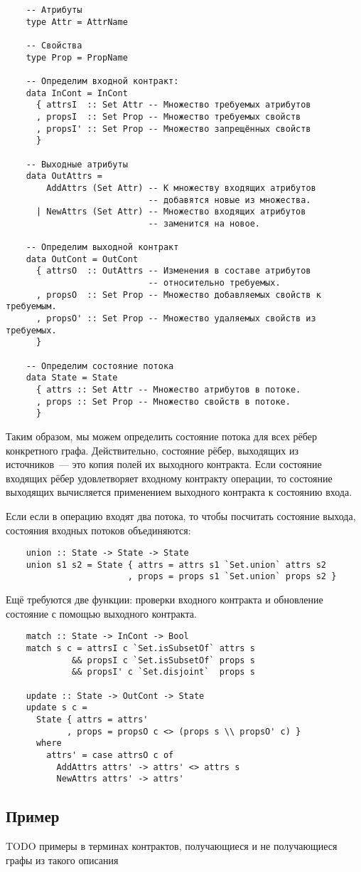 \begin{lstlisting}
    -- Атрибуты
    type Attr = AttrName

    -- Свойства
    type Prop = PropName

    -- Определим входной контракт:
    data InCont = InCont
      { attrsI  :: Set Attr -- Множество требуемых атрибутов
      , propsI  :: Set Prop -- Множество требуемых свойств
      , propsI' :: Set Prop -- Множество запрещённых свойств
      }

    -- Выходные атрибуты
    data OutAttrs =
        AddAttrs (Set Attr) -- К множеству входящих атрибутов
                            -- добавятся новые из множества.
      | NewAttrs (Set Attr) -- Множество входящих атрибутов
                            -- заменится на новое.

    -- Определим выходной контракт
    data OutCont = OutCont
      { attrsO  :: OutAttrs -- Изменения в составе атрибутов
                            -- относительно требуемых.
      , propsO  :: Set Prop -- Множество добавляемых свойств к требуемым.
      , propsO' :: Set Prop -- Множество удаляемых свойств из требуемых.
      }

    -- Определим состояние потока
    data State = State
      { attrs :: Set Attr -- Множество атрибутов в потоке.
      , props :: Set Prop -- Множество свойств в потоке.
      }
\end{lstlisting}

Таким образом, мы можем определить состояние потока для всех рёбер конкретного графа. Действительно, состояние рёбер, выходящих из источников~--- это копия полей их выходного контракта. Если состояние входящих рёбер удовлетворяет входному контракту операции, то состояние выходящих вычисляется применением выходного контракта к состоянию входа.

Если если в операцию входят два потока, то чтобы посчитать состояние выхода, состояния входных потоков объединяются:

\begin{lstlisting}
    union :: State -> State -> State
    union s1 s2 = State { attrs = attrs s1 `Set.union` attrs s2
                        , props = props s1 `Set.union` props s2 }
\end{lstlisting}

Ещё требуются две функции: проверки входного контракта и обновление состояние с помощью выходного контракта.

\begin{lstlisting}
    match :: State -> InCont -> Bool
    match s c = attrsI c `Set.isSubsetOf` attrs s
             && propsI c `Set.isSubsetOf` props s
             && propsI' c `Set.disjoint`  props s

    update :: State -> OutCont -> State
    update s c =
      State { attrs = attrs'
            , props = propsO c <> (props s \\ propsO' c) }
      where
        attrs' = case attrsO c of
          AddAttrs attrs' -> attrs' <> attrs s
          NewAttrs attrs' -> attrs'
\end{lstlisting}

\subsection{Пример}

TODO примеры в терминах контрактов, получающиеся и не получающиеся графы из такого описания

